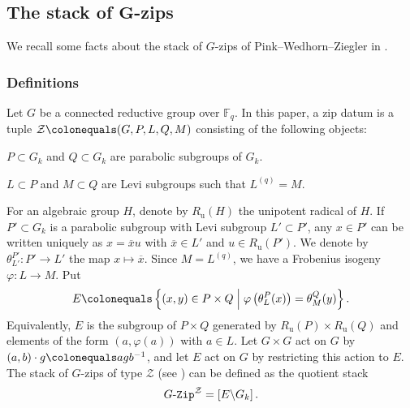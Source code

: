 \documentclass[11pt]{amsart}
\numberwithin{equation}{section}
\theoremstyle{definition}
\theoremstyle{remark}
\newcommand{\GZip}{\mathop{\text{$G$-{\tt Zip}}}\nolimits}
\newcommand{\Zcal}{{\mathcal Z}}
\newcommand{\FF}{\mathbb{F}}
\newcommand{\relmiddle}[1]{\mathrel{}\middle#1\mathrel{}}
\begin{document}
\subsection{The stack of $\boldsymbol{G}$-zips}\label{sec-Gzips}

We recall some facts about the stack of $G$-zips of Pink--Wedhorn--Ziegler in \cite{Pink-Wedhorn-Ziegler-zip-data}.

\subsubsection{Definitions} \label{subsec-zipdatum}
Let $G$ be a connected reductive group over $\FF_q$. In this paper, a zip datum is a tuple $\Zcal \colonequals (G,P,L,Q,M)$ consisting of the following objects:
\begin{equivlist}
    \item $P\subset G_k$ and $Q\subset G_k$ are parabolic subgroups of $G_k$.
    \item $L\subset P$ and $M\subset Q$ are Levi subgroups such that $L^{(q)}=M$. 
\end{equivlist}
For an algebraic group $H$, denote by $R_{\mathrm{u}}(H)$ the unipotent radical of $H$. If $P'\subset G_k$ is a parabolic subgroup with Levi subgroup $L'\subset P'$, any $x\in P'$ can be written uniquely as $x=\overline{x}u$ with $\overline{x}\in L'$ and $u\in R_{\mathrm{u}}(P')$. We denote by $\theta^{P'}_{L'} \colon P'\to L'$ the map $x\mapsto \overline{x}$. Since $M=L^{(q)}$, we have a Frobenius isogeny $\varphi \colon L\to M$. Put
\begin{equation}\label{zipgroup}
E \colonequals \left\{(x,y)\in P\times Q \relmiddle|  \varphi\left(\theta^P_L(x)\right)=\theta^Q_M(y)\right\}.
\end{equation}
Equivalently, $E$ is the subgroup of $P\times Q$ generated by $R_{\mathrm{u}}(P)\times R_{\mathrm{u}}(Q)$ and elements of the form $(a,\varphi(a))$ with $a\in L$. Let $G\times G$ act on $G$ by $(a,b)\cdot g \colonequals agb^{-1}$, and let $E$ act on $G$ by restricting this action to $E$. The stack of $G$-zips of type $\Zcal$ (see \cite{Pink-Wedhorn-Ziegler-zip-data,Pink-Wedhorn-Ziegler-F-Zips-additional-structure}) can be defined as the quotient stack
\[
\GZip^\Zcal = \left[E\backslash G_k \right].
\]
\end{document}
